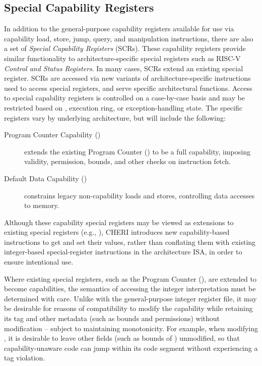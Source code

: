 \subsection{Special Capability Registers}
\label{section:special-capability-registers}

In addition to the general-purpose capability registers available for use via
capability load, store, jump, query, and manipulation instructions, there are
also a set of \textit{Special Capability Registers} (SCRs).
These capability registers provide similar functionality to
architecture-specific special registers such as RISC-V \textit{Control
  and Status Registers}.  In many cases, SCRs extend an existing
special register.
SCRs are accessed via new variants of architecture-specific
instructions used to access special registers, and serve specific
architectural functions.
Access to special capability registers is controlled on a case-by-case basis
and may be restricted based on \cappermASR, execution ring, or
exception-handling state.
The specific registers vary by underlying architecture, but will include the
following:

\begin{description}
\item[Program Counter Capability (\PCC{})] extends the existing Program
  Counter (\PC{}) to be a full capability, imposing validity, permission,
  bounds, and other checks on instruction fetch.

\item[Default Data Capability (\DDC{})] constrains legacy non-capability loads
  and stores, controlling data accesses to memory.
\end{description}

Although these capability special registers may be viewed as extensions to
existing special registers (e.g., \PC{}), CHERI introduces new
capability-based instructions to get and set their values, rather than
conflating them with existing integer-based special-register instructions in
the architecture ISA, in order to ensure intentional use.

Where existing special registers, such as the Program Counter (\PC{}),
are extended to become capabilities, the
semantics of accessing the integer interpretation must be determined with
care.
Unlike with the general-purpose integer register file, it may be desirable for
reasons of compatibility to modify the capability while retaining its tag
and other metadata (such as bounds and permissions) without modification --
subject to maintaining monotonicity.
For example, when modifying \PC{}, it is desirable to leave other fields (such
as bounds of \PCC{}) unmodified, so that
capability-unaware code can jump within its code segment without experiencing
a tag violation.

